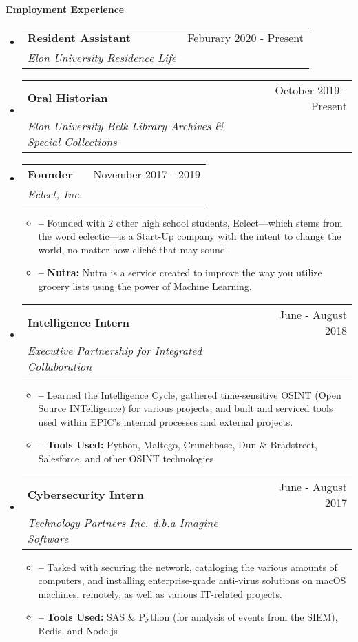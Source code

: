 \documentclass[letterpaper,10pt,draft]{article}
\makeatletter
\newlength{\outerbordwidth}
\newcommand{\resitem}[1]{\item[] \textbf{--} #1 \vspace{-2pt}}
\newcommand{\resheading}[1]{\vspace{8pt}
  {\setlength{\FrameSep}{\outerbordwidth}
    
\textbf{\large #1}
    
  }
}
\newcommand{\ressubheading}[3]{
\begin{tabular*}{6.5in}{l@{\cftdotfill{\cftsecdotsep}\extracolsep{\fill}}r}
		\textbf{#1} & #3\\
		\textit{#2} \\
\end{tabular*}\vspace{-6pt}}
\makeatother
\begin{document}
\resheading{Employment Experience}
\begin{itemize}
	\item[]
		\ressubheading{Resident Assistant}{Elon University Residence Life}{Feburary 2020 - Present}
	\item[]
		\ressubheading{Oral Historian}{Elon University Belk Library Archives \& Special Collections}{October 2019 - Present}

	\item[]

		\ressubheading{Founder}{Eclect, Inc.}{November 2017 - 2019}
			\begin{itemize}

				\resitem{Founded with 2 other high school students, Eclect---which stems from the word eclectic---is a Start-Up company with the intent to change the world, no matter how clich\'e that may sound.}

				\resitem{{\bf Nutra:} Nutra is a service created to improve the way you utilize grocery lists using the power of Machine Learning.}

			\end{itemize}
	\item[]

		\ressubheading{Intelligence Intern}{Executive Partnership for Integrated Collaboration}{June - August 2018}
			\begin{itemize}

				\resitem{Learned the Intelligence Cycle, gathered time-sensitive OSINT (Open Source INTelligence) for various projects, and built and serviced tools used within EPIC’s internal processes and external projects.}

				\resitem{{\bf Tools Used:} Python, Maltego, Crunchbase, Dun \& Bradstreet, Salesforce, and other OSINT technologies}

			\end{itemize}

	\item[]

		\ressubheading{Cybersecurity Intern}{Technology Partners Inc. d.b.a Imagine Software}{June - August 2017}

			\begin{itemize}

				\resitem{Tasked with securing the network, cataloging the various amounts of computers, and installing enterprise-grade anti-virus solutions on macOS machines, remotely, as well as various IT-related projects.}

				\resitem{{\bf Tools Used:} SAS \& Python (for analysis of events from the SIEM), Redis, and Node.js}

			\end{itemize}
\end{itemize}
\end{document}
